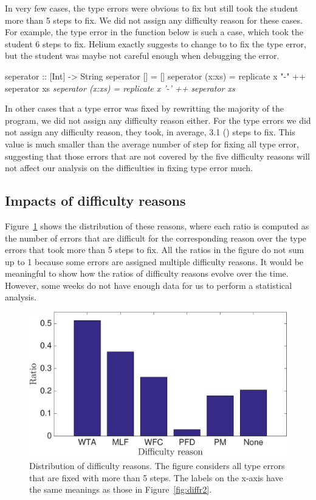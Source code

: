 \documentclass[12pt]{report}	%
\begin{document}
In very few cases, the type errors were obvious to fix 
but still took the student more than 5 steps to fix. We did
not assign any difficulty reason for these cases.
%
For example, the type error in the function  below is such a case,
which took
the student 6 steps to fix. 
Helium exactly suggests
to change \progdq{-} to \progsq{-} to fix the type error,
but the student 
was maybe not careful enough when debugging the error.
%
\begin{program}
seperator :: [Int] -> String
seperator [] = []
seperator (x:xs) = replicate x "-" ++ seperator xs
\it{seperator (x:xs) = replicate x '-' ++ seperator xs}
\end{program}
%
In other cases that a type error was fixed by rewritting the majority
of the program, we did not assign any difficulty reason either.
%
%
For the type errors we did not assign any
difficulty reason, they took, in average, 
3.1 () steps to fix. This value is much smaller
than the average number of step for fixing all type error,
suggesting that those errors that are not covered by the five difficulty reasons
will not affect our analysis on the difficulties in fixing type error much.


\subsection{Impacts of difficulty reasons}
\label{sec:diffr:res}

Figure~\ref{fig:diffr1} shows
the distribution of these reasons, where
each ratio is computed as the number of
errors that are difficult
for the corresponding reason over the type errors that took more than
5 steps to fix. All the ratios in the figure do not
sum up to 1 because some errors are assigned multiple
difficulty reasons.
%
It would be meaningful to show how the ratios of
difficulty reasons evolve over the time.
However, 
some weeks do not have enough data for us to perform 
a statistical analysis.

\begin{figure}
\centering
\includegraphics[width=0.85\columnwidth]{images/diffr.eps}
\caption[Distribution of difficulty reasons]{Distribution of difficulty reasons. The figure considers
all type errors that are fixed with more than 5 steps. The labels on 
the x-axis have the same meanings as those in Figure~\ref{fig:diffr2}.
}
\label{fig:diffr1}
\end{figure}
\end{document}
